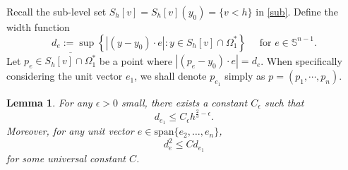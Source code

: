 \documentclass[10pt,a4paper]{amsart}
\theoremstyle{plain}
\newtheorem{lemma}{Lemma}[section]
\newcommand{\0}{\textbf{0}}
\numberwithin{equation}{section}
\numberwithin{equation}{section}
\numberwithin{figure}{section}
\begin{document}
Recall the sub-level set $S_h[v]=S_h[v](y_0)=\{v<h\}$ in \eqref{sub}.
Define the width function
\[
d_e := \sup \left\{ |(y-y_0) \cdot e| : y \in S_h[v] \cap \Omega_1^* \right\}\quad \mbox{ for } e\in\mathbb{S}^{n-1}. 
\]
Let $p_e \in \overline{S_h[v] \cap \Omega_1^*}$ be a point where $|(p_e-y_0) \cdot e| = d_e$. When specifically considering the unit vector $e_1$, we shall denote $p_{e_1}$ simply as $p=(p_1, \cdots, p_n)$.


\begin{lemma}\label{ide1}
For any $\epsilon>0$ small, there exists a constant $C_\epsilon$ such that 
	\[ d_{e_1} \leq C_{\epsilon}h^{\frac{2}{3} - \epsilon}. \]
Moreover, for any unit vector $e \in \mathrm{span}\{e_2, \ldots, e_n\}$,  
	\[ d_e^2 \leq C d_{e_1} \] 
for some universal constant $C$. 
\end{lemma}
\end{document}
